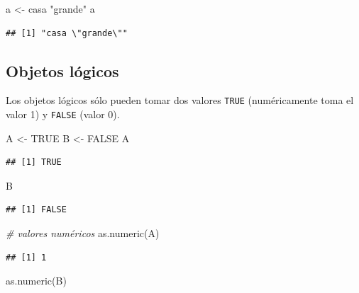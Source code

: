 \documentclass[
]{book}
\newenvironment{Shaded}{\begin{snugshade}}{\end{snugshade}}
\newcommand{\CommentTok}[1]{\textcolor[rgb]{0.56,0.35,0.01}{\textit{#1}}}
\newcommand{\ConstantTok}[1]{\textcolor[rgb]{0.00,0.00,0.00}{#1}}
\newcommand{\FunctionTok}[1]{\textcolor[rgb]{0.00,0.00,0.00}{#1}}
\newcommand{\NormalTok}[1]{#1}
\newcommand{\OtherTok}[1]{\textcolor[rgb]{0.56,0.35,0.01}{#1}}
\newcommand{\StringTok}[1]{\textcolor[rgb]{0.31,0.60,0.02}{#1}}
\theoremstyle{break}
\theoremstyle{nonumberplain}
\begin{document}
\begin{Shaded}
\begin{Highlighting}[]
\NormalTok{a }\OtherTok{\textless{}{-}} \StringTok{\textquotesingle{}casa "grande"\textquotesingle{}}
\NormalTok{a}
\end{Highlighting}
\end{Shaded}

\begin{verbatim}
## [1] "casa \"grande\""
\end{verbatim}

\hypertarget{objetos-luxf3gicos}{%
\subsection{Objetos lógicos}\label{objetos-luxf3gicos}}

Los objetos lógicos sólo pueden
tomar dos valores \texttt{TRUE} (numéricamente toma el valor 1) y \texttt{FALSE}
(valor 0).

\begin{Shaded}
\begin{Highlighting}[]
\NormalTok{A }\OtherTok{\textless{}{-}} \ConstantTok{TRUE}
\NormalTok{B }\OtherTok{\textless{}{-}} \ConstantTok{FALSE}
\NormalTok{A}
\end{Highlighting}
\end{Shaded}

\begin{verbatim}
## [1] TRUE
\end{verbatim}

\begin{Shaded}
\begin{Highlighting}[]
\NormalTok{B}
\end{Highlighting}
\end{Shaded}

\begin{verbatim}
## [1] FALSE
\end{verbatim}

\begin{Shaded}
\begin{Highlighting}[]
\CommentTok{\# valores numéricos}
\FunctionTok{as.numeric}\NormalTok{(A)}
\end{Highlighting}
\end{Shaded}

\begin{verbatim}
## [1] 1
\end{verbatim}

\begin{Shaded}
\begin{Highlighting}[]
\FunctionTok{as.numeric}\NormalTok{(B)}
\end{Highlighting}
\end{Shaded}
\end{document}

